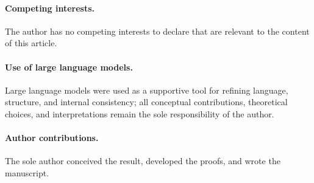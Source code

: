 \documentclass[12pt,a4paper]{article}
\begin{document}
  \paragraph{Competing interests.}
  The author has no competing interests to declare that are relevant to the content of this article.

  \paragraph{Use of large language models.}
  Large language models were used as a supportive tool for refining language, structure, and internal
  consistency; all conceptual contributions, theoretical choices, and interpretations remain the sole
  responsibility of the author.

  \paragraph{Author contributions.}
  The sole author conceived the result, developed the proofs, and wrote the manuscript.
\end{document}
